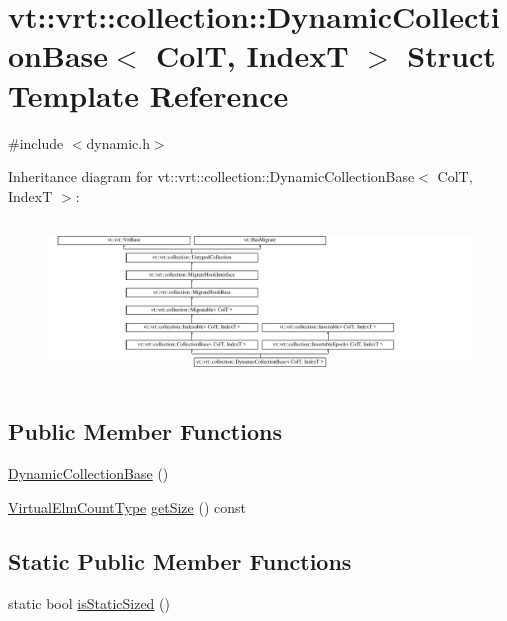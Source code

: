 \hypertarget{structvt_1_1vrt_1_1collection_1_1_dynamic_collection_base}{}\section{vt\+:\+:vrt\+:\+:collection\+:\+:Dynamic\+Collection\+Base$<$ ColT, IndexT $>$ Struct Template Reference}
\label{structvt_1_1vrt_1_1collection_1_1_dynamic_collection_base}


{\ttfamily \#include $<$dynamic.\+h$>$}

Inheritance diagram for vt\+:\+:vrt\+:\+:collection\+:\+:Dynamic\+Collection\+Base$<$ ColT, IndexT $>$\+:\begin{figure}[H]
\begin{center}
\leavevmode
\includegraphics[height=4.315992cm]{structvt_1_1vrt_1_1collection_1_1_dynamic_collection_base}
\end{center}
\end{figure}
\subsection*{Public Member Functions}
\begin{DoxyCompactItemize}
\item 
\hyperlink{structvt_1_1vrt_1_1collection_1_1_dynamic_collection_base_ac1b627912d81ccdd26e5a927615d871a}{Dynamic\+Collection\+Base} ()
\item 
\hyperlink{namespacevt_ac115668758184050beff7a9281a2c490}{Virtual\+Elm\+Count\+Type} \hyperlink{structvt_1_1vrt_1_1collection_1_1_dynamic_collection_base_a0e866cbff80a2d7072c1a0b3b11d2691}{get\+Size} () const
\end{DoxyCompactItemize}
\subsection*{Static Public Member Functions}
\begin{DoxyCompactItemize}
\item 
static bool \hyperlink{structvt_1_1vrt_1_1collection_1_1_dynamic_collection_base_ac0d47ae78d2be280bcdd4b4b80306396}{is\+Static\+Sized} ()
\end{DoxyCompactItemize}
